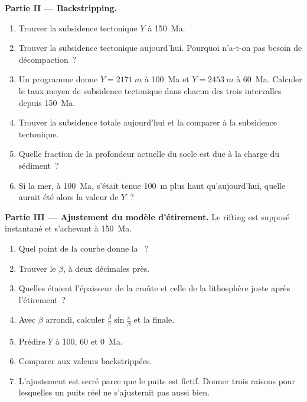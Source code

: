 \begin{problem}
\noindent\textbf{Partie II --- Backstripping.}
\begin{enumerate}[resume]
  \item Trouver la subsidence tectonique $Y$ à \qty{150}{Ma}.
  \item Trouver la subsidence tectonique aujourd'hui. Pourquoi n'a-t-on pas besoin de décompaction~?
  \item Un programme donne $Y = \qty{2171}{m}$ à \qty{100}{Ma} et $Y = \qty{2453}{m}$ à
        \qty{60}{Ma}. Calculer le taux moyen de subsidence tectonique dans chacun des trois
        intervalles depuis \qty{150}{Ma}.
  \item Trouver la subsidence totale aujourd'hui et la comparer à la subsidence tectonique.
  \item Quelle fraction de la profondeur actuelle du socle est due à la charge du sédiment~?
  \item Si la mer, à \qty{100}{Ma}, s'était tenue \qty{100}{m} plus haut qu'aujourd'hui, quelle aurait été
        alors la valeur de $Y$~?
\end{enumerate}

\noindent\textbf{Partie III --- Ajustement du modèle d'étirement.} Le rifting est supposé instantané
et s'achevant à \qty{150}{Ma}.
\begin{enumerate}[resume]
  \item Quel point de la courbe donne la ~?
  \item Trouver le  $\beta$, à deux décimales près.
  \item Quelles étaient l'épaisseur de la croûte et celle de la lithosphère juste après l'étirement~?
  \item Avec $\beta$ arrondi, calculer $\frac{\beta}{\pi}\sin\frac{\pi}{\beta}$ et la 
        finale.
  \item Prédire $Y$ à 100, 60 et \qty{0}{Ma}.
  \item Comparer aux valeurs backstrippées.
  \item L'ajustement est serré parce que le puits est fictif. Donner trois raisons pour lesquelles un puits réel
        ne s'ajusterait pas aussi bien.
\end{enumerate}


\end{problem}
